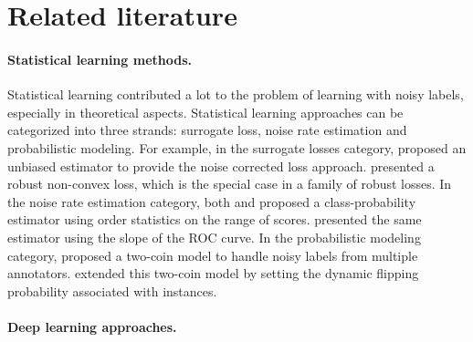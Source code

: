 \documentclass{article}
\begin{document}
\appendix
\cleardoublepage
\onecolumn

\section{Related literature}
\label{sect:relatedworks}
\paragraph{Statistical learning methods.}
Statistical learning contributed a lot to the problem of learning with noisy labels, especially in theoretical aspects. Statistical learning approaches can be categorized into three strands: surrogate loss, noise rate estimation and probabilistic modeling. For example, in the surrogate losses category,
\citet{natarajan2013learning} proposed an unbiased estimator to provide the noise corrected loss approach.
\citet{masnadi2009design} presented a robust non-convex loss, which is the special case in a family of robust losses.
In the noise rate estimation category, both \citet{menon2015learning} and \citet{liu2016classification} proposed a class-probability estimator using order statistics on the range of scores. \citet{sanderson2014class} presented the same estimator using the slope of the ROC curve. In the probabilistic modeling category, \citet{raykar2010learning} proposed a two-coin model to handle noisy labels from multiple annotators. \citet{yan2014learning} extended this two-coin model by setting the dynamic flipping probability associated with instances.
\vspace{-10px}
\paragraph{Deep learning approaches.}
\end{document}
